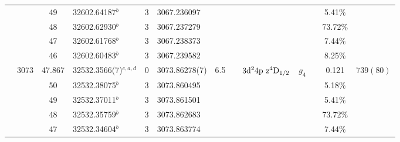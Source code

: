 \begin{table*}
\begin{center}
{\begin{tabular}{:l;l;c;l;c;l;c;l;l;c;c;c;c}
\rowstyle{\itshape}               &        & 49        & 32602.64187$^{b}$                & 3 &   3067.236097      &      & $                                        $ & $                                        $ & $      $ &              & 5.41\%    & $          $\\
\rowstyle{\itshape}               &        & 48        & 32602.62930$^{b}$                & 3 &   3067.237279      &      & $                                        $ & $                                        $ & $      $ &              & 73.72\%   & $          $\\
\rowstyle{\itshape}               &        & 47        & 32602.61768$^{b}$                & 3 &   3067.238373      &      & $                                        $ & $                                        $ & $      $ &              & 7.44\%    & $          $\\
\rowstyle{\itshape}               &        & 46        & 32602.60483$^{b}$                & 3 &   3067.239582      &      & $                                        $ & $                                        $ & $      $ &              & 8.25\%    & $          $\\
                                  & 3073   & 47.867    & 32532.3566(7)$^{c,a,d}$          & 0 &    3073.86278(7)   &  6.5 & $                                        $ & $3\rm{d}^24\rm{p~z}^4\rm{D}_{1/2}        $ & $g_{4} $ &              & 0.121     & $  739(80) $\\
\rowstyle{\itshape}               &        & 50        & 32532.38075$^{b}$                & 3 &   3073.860495      &      & $                                        $ & $                                        $ & $      $ &              & 5.18\%    & $          $\\
\rowstyle{\itshape}               &        & 49        & 32532.37011$^{b}$                & 3 &   3073.861501      &      & $                                        $ & $                                        $ & $      $ &              & 5.41\%    & $          $\\
\rowstyle{\itshape}               &        & 48        & 32532.35759$^{b}$                & 3 &   3073.862683      &      & $                                        $ & $                                        $ & $      $ &              & 73.72\%   & $          $\\
\rowstyle{\itshape}               &        & 47        & 32532.34604$^{b}$                & 3 &   3073.863774      &      & $                                        $ & $                                        $ & $      $ &              & 7.44\%    & $          $\\

\end{tabular}}
\end{center}
\end{table*}
